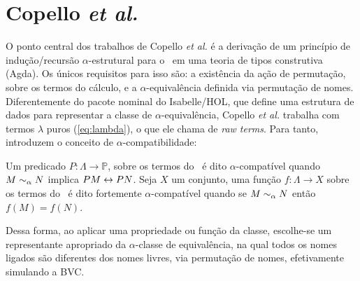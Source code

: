 \section{Copello \textit{et al.}}\label{sec:copello}
O ponto central dos trabalhos de Copello \textit{et al.} \cite{Copello2016,Copello2018} é a derivação de um princípio de indução/recursão $\alpha$-estrutural para o \lcalc~em uma teoria de tipos construtiva (Agda). Os únicos requisitos para isso são: a existência da ação de permutação, sobre os termos do cálculo, e a $\alpha$-equivalência definida via permutação de nomes. Diferentemente do pacote nominal do Isabelle/HOL, que define uma estrutura de dados para representar a classe de $\alpha$-equivalência, Copello \textit{et al.} trabalha com termos $\lambda$ puros (\ref{eq:lambda}), o que ele chama de \textit{raw terms}. Para tanto, introduzem o conceito de $\alpha$-compatibilidade:
\begin{definicao}\label{def:alpha-compatibilidade}
Um predicado $P: \Lambda \rightarrow \mathbb{P}$, sobre os termos do \lcalc~é dito $\alpha$-compatível quando $M \sim_{\alpha} N$ implica $P M \leftrightarrow P N$.
Seja $X$ um conjunto, uma função $f: \Lambda \rightarrow X$ sobre os termos do \lcalc~é dito fortemente $\alpha$-compatível quando se $M \sim_{\alpha} N$ então $f(M) = f(N)$.
\end{definicao}\noindent
Dessa forma, ao aplicar uma propriedade ou função da classe, escolhe-se um representante apropriado da $\alpha$-classe de equivalência, na qual todos os nomes ligados são diferentes dos nomes livres, via permutação de nomes, efetivamente simulando a BVC.

